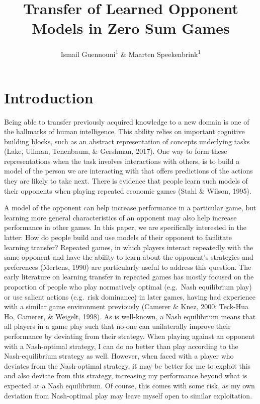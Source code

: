 \documentclass[
  english,
  man,floatsintext]{apa6}
\title{Transfer of Learned Opponent Models in Zero Sum Games}
\author{Ismail Guennouni\textsuperscript{1} \& Maarten Speekenbrink\textsuperscript{1}}
\date{}
\affiliation{\vspace{0.5cm}\textsuperscript{1} Department of Experimental Psychology, University College London}
\begin{document}
\maketitle

\hypertarget{introduction}{%
\section{Introduction}\label{introduction}}

Being able to transfer previously acquired knowledge to a new domain is one of the hallmarks of human intelligence. This ability relies on important cognitive building blocks, such as an abstract representation of concepts underlying tasks (Lake, Ullman, Tenenbaum, \& Gershman, 2017). One way to form these representations when the task involves interactions with others, is to build a model of the person we are interacting with that offers predictions of the actions they are likely to take next. There is evidence that people learn such models of their opponents when playing repeated economic games (Stahl \& Wilson, 1995).

A model of the opponent can help increase performance in a particular game, but learning more general characteristics of an opponent may also help increase performance in other games. In this paper, we are specifically interested in the latter: How do people build and use models of their opponent to facilitate learning transfer? Repeated games, in which players interact repeatedly with the same opponent and have the ability to learn about the opponent's strategies and preferences (Mertens, 1990) are particularly useful to address this question. The early literature on learning transfer in repeated games has mostly focused on the proportion of people who play normatively optimal (e.g.~Nash equilibrium play) or use salient actions (e.g.~risk dominance) in later games, having had experience with a similar game environment previously (Camerer \& Knez, 2000; Teck-Hua Ho, Camerer, \& Weigelt, 1998). As is well-known, a Nash equilibrium means that all players in a game play such that no-one can unilaterally improve their performance by deviating from their strategy. When playing against an opponent with a Nash-optimal strategy, I can do no better than play according to the Nash-equilibrium strategy as well. However, when faced with a player who deviates from the Nash-optimal strategy, it may be better for me to exploit this and also deviate from this strategy, increasing my performance beyond what is expected at a Nash equilibrium. Of course, this comes with some risk, as my own deviation from Nash-optimal play may leave myself open to similar exploitation.
\end{document}
